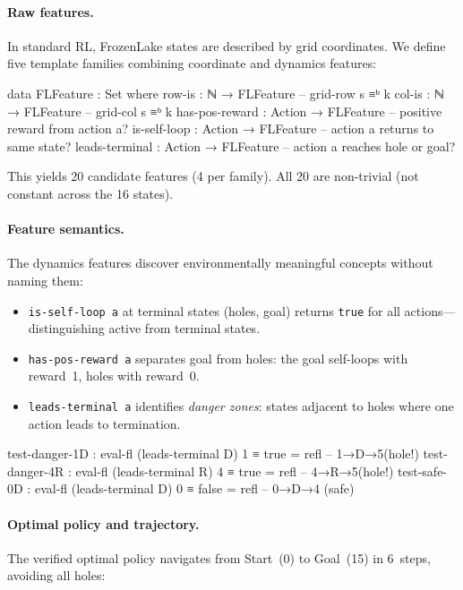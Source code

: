 \paragraph{Raw features.}  In standard RL, FrozenLake states are described by grid coordinates.  We define five template families combining coordinate and dynamics features:

\begin{spec}
data FLFeature : Set where
  row-is         : ℕ → FLFeature   -- grid-row s ≡ᵇ k
  col-is         : ℕ → FLFeature   -- grid-col s ≡ᵇ k
  has-pos-reward : Action → FLFeature   -- positive reward from action a?
  is-self-loop   : Action → FLFeature   -- action a returns to same state?
  leads-terminal : Action → FLFeature   -- action a reaches hole or goal?
\end{spec}

\noindent This yields 20 candidate features (4 per family).  All 20 are non-trivial (not constant across the 16 states).

\paragraph{Feature semantics.}
The dynamics features discover environmentally meaningful concepts without naming them:
\begin{itemize}
\item \texttt{is-self-loop~a} at terminal states (holes, goal) returns \texttt{true} for all actions---distinguishing active from terminal states.
\item \texttt{has-pos-reward~a} separates goal from holes: the goal self-loops with reward~1, holes with reward~0.
\item \texttt{leads-terminal~a} identifies \emph{danger zones}: states adjacent to holes where one action leads to termination.
\end{itemize}

\begin{spec}
test-danger-1D : eval-fl (leads-terminal D) 1 ≡ true   = refl   -- 1→D→5(hole!)
test-danger-4R : eval-fl (leads-terminal R) 4 ≡ true   = refl   -- 4→R→5(hole!)
test-safe-0D   : eval-fl (leads-terminal D) 0 ≡ false  = refl   -- 0→D→4 (safe)
\end{spec}

\paragraph{Optimal policy and trajectory.}
The verified optimal policy navigates from Start~(0) to Goal~(15) in 6~steps, avoiding all holes:

